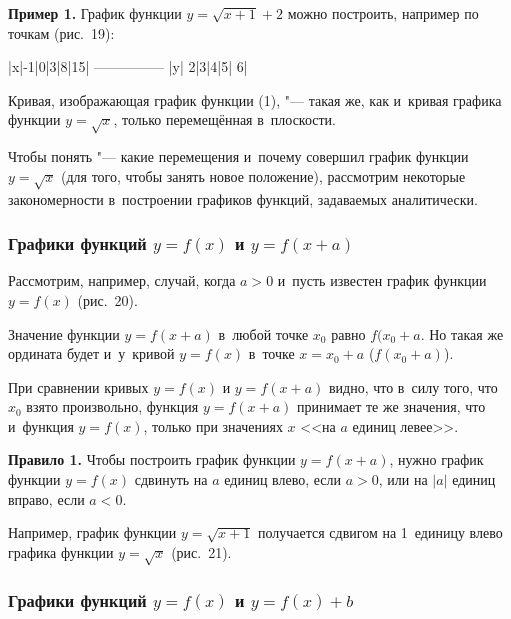 \textbf{Пример 1.} График функции $y = \sqrt{x+1} + 2$ можно построить,
например по точкам (рис.\ 19):

|x|-1|0|3|8|15|
---------------
|y| 2|3|4|5| 6|

\begin{figure}
\end{figure}

Кривая, изображающая график функции (1), "--- такая же, как и~кривая графика
функции $y = \sqrt{x}$, только перемещённая в~плоскости.

Чтобы понять "--- какие перемещения и~почему совершил график функции $y = \sqrt{x}$
(для того, чтобы занять новое положение), рассмотрим некоторые закономерности
в~построении графиков функций, задаваемых аналитически.


\subsubsection{Графики функций $y = f(x)$ и $y = f(x + a)$}

Рассмотрим, например, случай, когда $a > 0$ и~пусть известен график функции
$y = f(x)$ (рис.\ 20).

\begin{figure}
\end{figure}

Значение функции $y = f(x + a)$ в~любой точке $x_{0}$ равно $f(x_{0} + a$.
Но такая же ордината будет и~у~кривой $y = f(x)$ в~точке $x = x_{0} + a$
($f(x_{0} + a)$).

При сравнении кривых $y = f(x)$ и $y = f(x + a)$ видно, что в~силу того,
что $x_{0}$ взято произвольно, функция $y = f(x + a)$ принимает те же значения,
что и~функция $y = f(x)$, только при значениях $x$ <<на $a$ единиц левее>>.

\textbf{Правило 1.} Чтобы построить график функции $y = f(x + a)$,
нужно график функции $y = f(x)$ сдвинуть на $a$ единиц влево,
если $a > 0$, или на $|a|$ единиц вправо, если $a < 0$.

\begin{figure}
\end{figure}

Например, график функции $y = \sqrt{x + 1}$ получается сдвигом на 1~единицу влево
графика функции $y = \sqrt{x}$ (рис.\ 21).

\begin{figure}
\end{figure}


\subsubsection{Графики функций $y = f(x)$ и $y = f(x) + b$}

